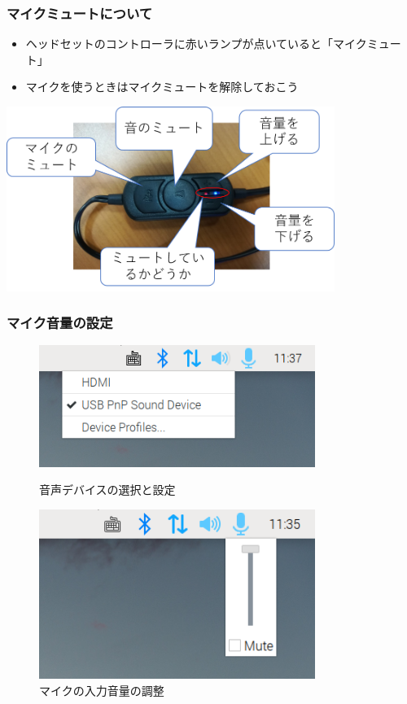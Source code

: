 \documentclass[14pt]{beamer}
\begin{document}
\begin{frame}
  \frametitle{マイクミュートについて}
  \begin{itemize}
    \item ヘッドセットのコントローラに赤いランプが点いていると「マイクミュート」
    \item マイクを使うときはマイクミュートを解除しておこう
  \end{itemize}
  \centering
  \includegraphics[width=0.8\textwidth]{chap06/text06-img004.png}
\end{frame}

\begin{frame}
  \frametitle{マイク音量の設定}

  \begin{figure}
    \centering
    \includegraphics[width=0.8\textwidth]{select_sink.png}
    \caption{音声デバイスの選択と設定}
    \includegraphics[width=0.8\textwidth]{microphone_volume.png}
    \caption{マイクの入力音量の調整}
  \end{figure}

\end{frame}
\end{document}
